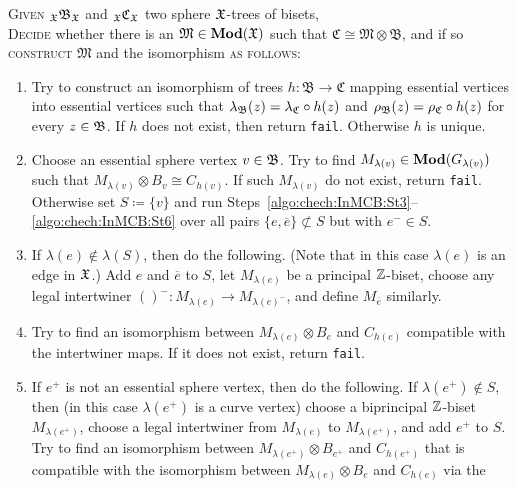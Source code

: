 \documentclass{amsart}
\begin{document}
\begin{algo}\label{algo:chech:InMCB:pre}
  \textsc{Given} ${}_{\mathfrak X}\mathfrak B_{\mathfrak X}$ and ${}_{\mathfrak X}\mathfrak C_{\mathfrak X}$
  two sphere ${\mathfrak X}$-trees of bisets,\\
  \textsc{Decide} whether there is an  $\mathfrak M\in \mathbf{\relax Mod}({\mathfrak X})$ such that 
  $\mathfrak C\cong \mathfrak M \otimes \mathfrak B $, and if so
  \textsc{construct} $\mathfrak M$ and the isomorphism \textsc{as follows:}\\\upshape
  \begin{enumerate} 
  \item Try to construct an isomorphism of trees
    $h\colon \mathfrak B\to\mathfrak C$ mapping essential vertices
    into essential vertices such that
    $\lambda_{\mathfrak B} (z)=\lambda_{\mathfrak C} \circ h(z)$ and
    $\rho_{\mathfrak B}(z)=\rho_{\mathfrak C} \circ h(z)$ for every $z\in{\mathfrak B}$. If $h$
    does not exist, then return \texttt{fail}. Otherwise $h$ is
    unique.
  \item Choose an essential sphere vertex $v\in {\mathfrak B}$. Try to find
    $M_{\lambda(v)} \in \mathbf{\relax Mod}(G_{\lambda(v)})$ such that
    $M_{\lambda(v)} \otimes B_v \cong C_{h(v)}$. If such
    $M_{\lambda(v)}$ do not exist, return \texttt{fail}. Otherwise set
    $S\coloneqq \{v\}$ and run
    Steps~\ref{algo:chech:InMCB:St3}--\ref{algo:chech:InMCB:St6} over
    all pairs $\{e,\overline e\}\not\subset S$ but with $e^- \in S$.
  \item If $\lambda(e)\notin \lambda(S)$, then do the
    following. (Note that in this case $\lambda(e)$ is an edge in
    ${\mathfrak X}$.) Add $e$ and $\overline e$ to $S$, let $M_{\lambda(e)}$ be
    a principal ${\mathbb Z}$-biset, choose any legal intertwiner
    $()^-\colon M_{\lambda(e)}\to M_{\lambda(e)^-}$, and define
    $M_{\overline e}$ similarly.\label{algo:chech:InMCB:St3}
  \item Try to find an isomorphism between
    $M_{\lambda(e)}\otimes B_{e}$ and $C_{h(e)}$ compatible with the
    intertwiner maps. If it does not exist, return \texttt{fail}.
  \item If $e^+$ is not an essential sphere vertex, then do the
    following. If $\lambda(e^+)\notin S$, then (in this case
    $\lambda(e^+)$ is a curve vertex) choose a biprincipal ${\mathbb Z}$-biset
    $M_{\lambda(e^+)}$, choose a legal intertwiner from
    $M_{\lambda(e)}$ to $M_{{\lambda(e^+)}}$, and add $e^+$ to
    $S$. Try to find an isomorphism between
    $M_{\lambda(e^+)}\otimes B_{e^+}$ and $C_{h(e^+)}$ that is
    compatible with the isomorphism between
    $M_{\lambda(e)}\otimes B_{e}$ and $C_{h(e)}$ via the

\end{enumerate}
\end{algo}
\end{document}
